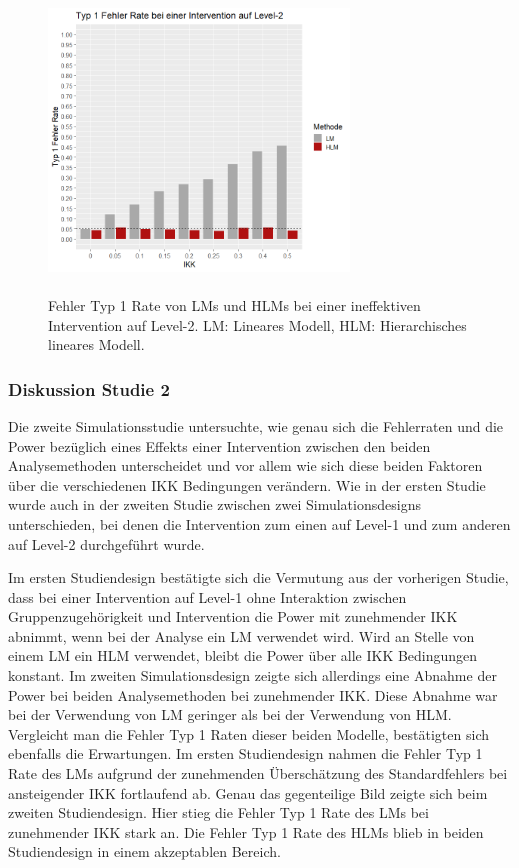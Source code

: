 \documentclass[12pt]{article}\usepackage[]{graphicx}\usepackage[]{color}
\begin{document}
\begin{figure}[t!]
\centering
\captionsetup{width=8cm}
\includegraphics[width=8cm, height=8cm]{./figures/results_error_lvl2}
\caption{Fehler Typ 1 Rate von LMs und HLMs bei einer ineffektiven Intervention auf Level-2. LM: Lineares Modell, HLM: Hierarchisches lineares Modell.}
\label{fig:results_error_lvl2}
\end{figure}

\subsubsection{Diskussion Studie 2}
Die zweite Simulationsstudie untersuchte, wie genau sich die Fehlerraten und die Power bezüglich eines Effekts einer Intervention zwischen den beiden Analysemethoden unterscheidet und vor allem wie sich diese beiden Faktoren über die verschiedenen IKK Bedingungen verändern. Wie in der ersten Studie wurde auch in der zweiten Studie zwischen zwei Simulationsdesigns unterschieden, bei denen die Intervention zum einen auf Level-1 und zum anderen auf Level-2 durchgeführt wurde.

Im ersten Studiendesign bestätigte sich die Vermutung aus der vorherigen Studie, dass bei einer Intervention auf Level-1 ohne Interaktion zwischen Gruppenzugehörigkeit und Intervention die Power mit zunehmender IKK abnimmt, wenn bei der Analyse ein LM verwendet wird. Wird an Stelle von einem LM ein HLM verwendet, bleibt die Power über alle IKK Bedingungen konstant. Im zweiten Simulationsdesign zeigte sich allerdings eine Abnahme der Power bei beiden Analysemethoden bei zunehmender IKK. Diese Abnahme war bei der Verwendung von LM geringer als bei der Verwendung von HLM. Vergleicht man die Fehler Typ 1 Raten dieser beiden Modelle, bestätigten sich ebenfalls die Erwartungen. Im ersten Studiendesign nahmen die Fehler Typ 1 Rate des LMs aufgrund der zunehmenden Überschätzung des Standardfehlers bei ansteigender IKK fortlaufend ab. Genau das gegenteilige Bild zeigte sich beim zweiten Studiendesign. Hier stieg die Fehler Typ 1 Rate des LMs bei zunehmender IKK stark an. Die Fehler Typ 1 Rate des HLMs blieb in beiden Studiendesign in einem akzeptablen Bereich. 
\end{document}
